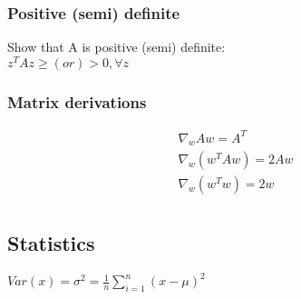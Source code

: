 \subsubsection{Positive (semi) definite}
\small Show that A is positive (semi) definite:\\
$z^{T}Az \geq (or) > 0, \forall z$\\
\subsubsection{Matrix derivations}
\begin{equation}
	\begin{aligned}
		\nabla_{w}Aw = A^T\\ \nabla_w(w^{T}Aw) = 2Aw\\ \nabla_w(w^{T}w) = 2w\\
	\end{aligned}
\end{equation}
\subsection{Statistics}
$Var(x) = \sigma^{2}= \frac{1}{n}\sum_{i=1}^{n}(x-\mu)^{2}$